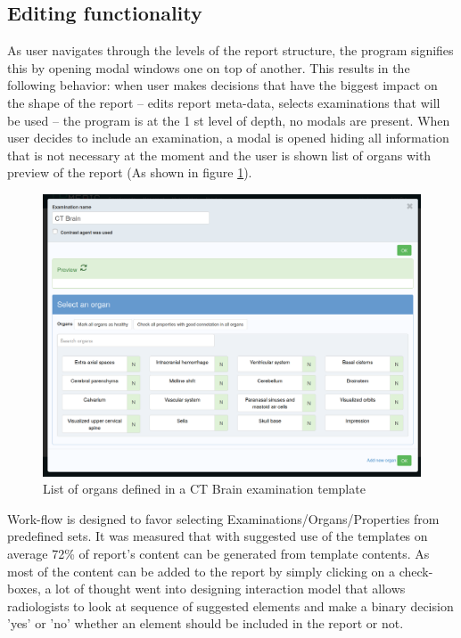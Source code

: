 \documentclass[12pt, twoside, openany]{report}
\theoremstyle{definition}
\begin{document}
\subsection{Editing functionality}
As user navigates through the levels of the report structure, the program signifies this by opening modal windows one on top of another. This results in the following behavior: when user makes decisions that have the biggest impact on the shape of the report -- edits report meta-data, selects examinations that will be used -- the program is at the 1 st level of depth, no modals are present.
When user decides to include an examination, a modal is opened hiding all information that is not necessary at the moment and the user is shown list of organs with preview of the report (As shown in figure \ref{fig:organ-list}).
\begin{figure}
	\begin{center}

	\includegraphics[width=\linewidth]{organs-modal}
	\caption{List of organs defined in a CT Brain examination template
		\label{fig:organ-list}
	}
	\end{center}
\end{figure}
Work-flow is designed to favor selecting Examinations/Organs/Properties from predefined sets. It was measured that with suggested use of the templates on average 72\% of report's content can be generated from template contents. As most of the content can be added to the report by simply clicking on a check-boxes, a lot of thought went into designing interaction model that allows radiologists to look at sequence of suggested elements and make a binary decision 'yes' or 'no' whether an element should be included in the report or not. 
\end{document}
